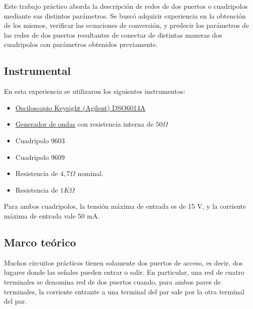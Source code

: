 Este trabajo práctico aborda la descripción de redes de dos puertos o cuadripolos mediante sus distintos
parámetros. Se buscó adquirir experiencia en la obtención de los mismos,
verificar las ecuaciones de conversión, y predecir los parámetros de las redes de dos puertos resultantes
de conectar de distintas maneras dos cuadripolos con parámetros obtenidos previamente.

\subsection{Instrumental}
        En esta experiencia se utilizaron los siguientes instrumentos:
\begin{itemize}
  \item \href{https://www.rftesolutions.com/index.php?main_page=product_info&products_id=729}{Osciloscopio Keysight (Agilent) DSO6014A}
  \item \href{https://www.keysight.com/us/en/product/EDU33212A/waveform-generator-20mhz-2-channel.html}{Generador de ondas}  con 
        resistencia interna de $ 50 \Omega $ %
  \item Cuadripolo 9603
  \item Cuadripolo 9609
  \item Resistencia de $ 4,7 \Omega $ nominal.
  \item Resistencia de $ 1 K\Omega $
\end{itemize}
Para ambos cuadripolos, la tensión máxima de entrada es de 15 V, y la corriente máxima de entrada vale 50 mA.

\subsection{Marco teórico}
Muchos circuitos prácticos tienen solamente dos puertos de acceso, es decir, dos lugares donde las
señales pueden entrar o salir. En particular, una red de cuatro terminales se denomina red de dos
puertos cuando, para ambos pares de terminales, la corriente entrante a una terminal del par sale
por la otra terminal del par. \par

